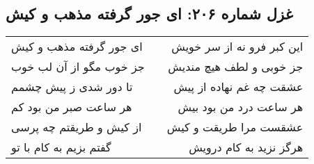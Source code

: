 \begin{center}
\section*{غزل شماره ۲۰۶: ای جور گرفته مذهب و کیش}
\label{sec:206}
\begin{longtable}{l p{0.5cm} r}
ای جور گرفته مذهب و کیش
&&
این کبر فرو نه از سر خویش
\\
جز خوب مگو از آن لب خوب
&&
جز خوبی و لطف هیچ مندیش
\\
تا دور شدی ز پیش چشمم
&&
عشقت چه غم نهاده از پیش
\\
هر ساعت صبر من بود کم
&&
هر ساعت درد من بود بیش
\\
از کیش و طریقتم چه پرسی
&&
عشقست مرا طریقت و کیش
\\
گفتم بزیم به کام با تو
&&
هرگز نزید به کام درویش
\\
\end{longtable}
\end{center}
